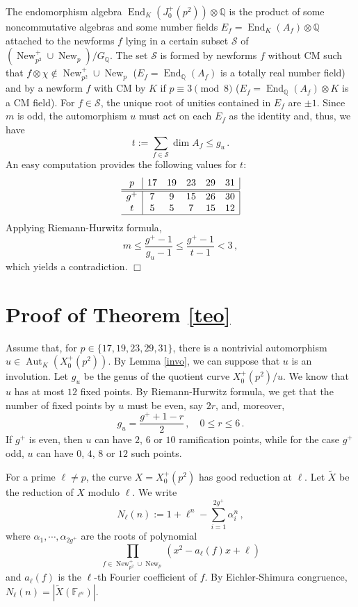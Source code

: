 \documentclass[a4paper,12pt]{article}
\theoremstyle{definition}
\theoremstyle{remark}
\numberwithin{equation}{section}
\newcommand{\Q}{\mathbb{Q}}
\newcommand{\F}{\mathbb{F}}
\newcommand{\End}{\operatorname{End}}
\newcommand{\Aut}{\operatorname{Aut}}
\newcommand{\New}{\operatorname{New}}
\newcommand{\cS}{{\mathcal S}}
\begin{document}
 The endomorphism algebra $\End_K(J_0^+(p^2))\otimes \Q$ is the product
of some noncommutative algebras and some number fields $E_f=\End_K (A_f)\otimes\Q$ attached to the  newforms $f$ lying in a certain subset $\cS$ of $ (\New_{p^2}^+\cup \New_p)/G_\Q$. The set $\cS$ is formed by newforms $f$ without CM such that $f\otimes \chi\notin \New_{p^2}^+\cup\New_p$ ($E_f=\End_\Q(A_f)$ is a totally real number field) and by a newform $f$ with CM by $K$  if $p\equiv 3\pmod 8$ ($E_f=\End_\Q(A_f)\otimes K$ is a CM field). For $f\in\cS$,  the unique root of unities contained in $E_f$  are $\pm 1$. Since $m$ is odd,  the automorphism $u$ must act on each $E_f$ as the identity and, thus,  we have
$$t:= \sum_{f\in \cS}\dim A_f\leq g_u\,.$$
 An easy  computation provides the following values for $t$:
$$
\begin{array}{c|ccccc|}
p& 17 &19 &23 & 29& 31\\\hline\hline
g^+&7 & 9& 15& 26 & 30\\
t&5 & 5& 7& 15 & 12\\ \hline
\end{array}
$$
 Applying Riemann-Hurwitz formula,
 $$\displaystyle{m\leq \frac{g^+-1}{g_u-1}\leq \frac{g^+-1}{t-1}}<3\,,$$which yields a contradiction.
\hfill $\Box$
\section{Proof of Theorem \ref{teo}}


Assume that, for $p\in\{17,19,23,29,31\}$, there is a nontrivial  automorphism $u\in\Aut_K(X_0^+(p^2))$. By Lemma \ref{invo}, we can suppose that $u$ is an involution. Let  $g_u$ be the genus of the quotient curve $X_0^+(p^2)/u$.
   We  know that $u$   has at most $12$ fixed points.
 By Riemann-Hurwitz formula,  we get that the number of fixed points by $u$ must be even, say $2r$, and, moreover,
$$
g_u=\frac{g^++1-r}{2}\,,\quad 0\leq r\leq 6\,.
$$
If $g^+$ is even, then $u$ can have $2$, $6$ or $10$ ramification points, while for the case $g^+$ odd, $u$ can have $0$,  $4$, $8$ or $12$  such points.

For a prime $\ell\neq p$, the curve $X=X_0^+(p^2)$ has good reduction at $\ell$. Let  $\widetilde{X}$ be the reduction of  $X$  modulo $\ell$. We write
$$
N_{\ell}(n):=1+\ell^n-\sum_{i=1}^{2 g^+}\alpha_i^n\,,
$$
where $\alpha_1,\cdots,\alpha_{2 g^+}$ are the roots of polynomial
$$
\prod_{f\in \New_{p^2}^+\cup\New_p}(x^2-a_{\ell}(f) x+\ell)
$$
and $a_{\ell}(f)$ is the $\ell$-th Fourier coefficient of $f$. By Eichler-Shimura congruence,
$N_{\ell}(n)=|\widetilde{X}(\F_{\ell^n})|$.
\end{document}
